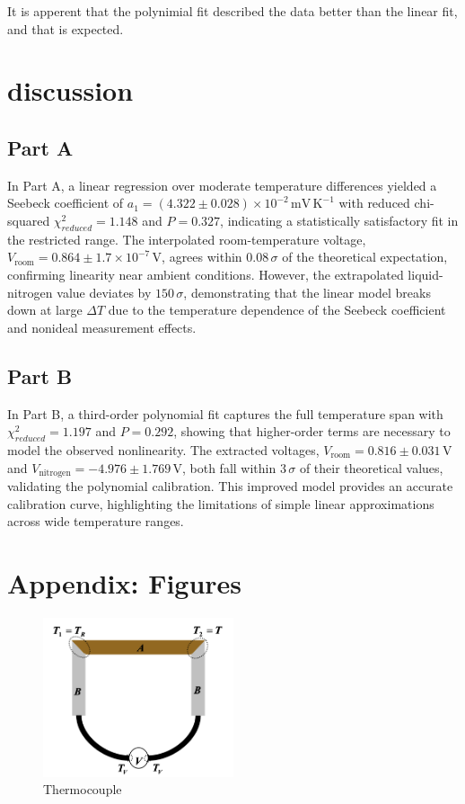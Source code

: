 \documentclass[12pt,a4paper]{report}
\begin{document}
It is apperent that the polynimial fit described the data better than the linear fit, and that is expected. 

\pagebreak
\section{discussion}

\subsection{Part A}
In Part A, a linear regression over moderate temperature differences yielded a Seebeck coefficient of 
$a_1 = (4.322 \pm 0.028)\times10^{-2}\,\mathrm{mV\,K^{-1}}$ with reduced chi-squared 
$\chi^2_{reduced} = 1.148$ and $P = 0.327$, indicating a statistically satisfactory fit in the restricted range. 
The interpolated room-temperature voltage, $V_{\mathrm{room}} = 0.864 \pm 1.7\times10^{-7}\,\mathrm{V}$, 
agrees within $0.08\,\sigma$ of the theoretical expectation, confirming linearity near ambient conditions. 
However, the extrapolated liquid-nitrogen value deviates by $150\,\sigma$, demonstrating that the linear 
model breaks down at large $\Delta T$ due to the temperature dependence of the Seebeck coefficient and 
nonideal measurement effects.


\subsection{Part B}
In Part B, a third-order polynomial fit captures the full temperature span with 
$\chi^2_{reduced} = 1.197$ and $P = 0.292$, showing that higher-order terms are necessary to model the 
observed nonlinearity. The extracted voltages, $V_{\mathrm{room}} = 0.816 \pm 0.031\,\mathrm{V}$ and 
$V_{\mathrm{nitrogen}} = -4.976 \pm 1.769\,\mathrm{V}$, both fall within $3\,\sigma$ of their theoretical 
values, validating the polynomial calibration. This improved model provides an accurate calibration curve, highlighting the limitations of simple linear approximations 
across wide temperature ranges.

\pagebreak
\appendix

\section{Appendix: Figures}

\begin{figure}[H]
    \centering
    \includegraphics[width=0.5\textwidth]{general IMG/Kthermo.png}
    \caption{Thermocouple}
    \label{fig:thermocouple}
\end{figure}
\end{document}
